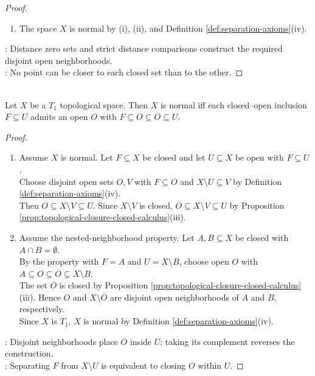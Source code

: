 \begin{proposition}
\begin{proof}
\begin{enumerate}[label=(\roman*)]
\begin{enumerate}[label=(\alph*)]
\item {}: The intersection $O_1\cap O_2$ is empty because $d_1(x)<d_2(x)$ and $d_2(x)<d_1(x)$ cannot both hold.
\end{enumerate}
\item The space $X$ is normal by (i), (ii), and Definition \ref{def:separation-axioms}(iv).
\end{enumerate}
: Distance zero sets and strict distance comparisons construct the required disjoint open neighborhoods.\\
: No point can be closer to each closed set than to the other.
\end{proof}
\end{proposition}

\begin{proposition} \label{prop:normality-nested-neighborhoods} \\
Let $X$ be a $T_1$ topological space. Then $X$ is normal iff each closed--open inclusion $F\subseteq U$ admits an open $O$ with $F\subseteq O\subseteq\overline{O}\subseteq U$.
\begin{proof}
\begin{enumerate}[label=\roman*.]
\setlength{\itemsep}{0pt}
\item[$(\Rightarrow)$] Assume $X$ is normal. Let $F\subseteq X$ be closed and let $U\subseteq X$ be open with $F\subseteq U$.\\
Choose disjoint open sets $O,V$ with $F\subseteq O$ and $X\setminus U\subseteq V$ by Definition \ref{def:separation-axioms}(iv).\\
Then $O\subseteq X\setminus V\subseteq U$. Since $X\setminus V$ is closed, $\overline{O}\subseteq X\setminus V\subseteq U$ by Proposition \ref{prop:topological-closure-closed-calculus}(iii).
\item[$(\Leftarrow)$] Assume the nested-neighborhood property. Let $A,B\subseteq X$ be closed with $A\cap B=\emptyset$.\\
By the property with $F=A$ and $U=X\setminus B$, choose open $O$ with $A\subseteq O\subseteq\overline{O}\subseteq X\setminus B$.\\
The set $\overline{O}$ is closed by Proposition \ref{prop:topological-closure-closed-calculus}(iii). Hence $O$ and $X\setminus\overline{O}$ are disjoint open neighborhoods of $A$ and $B$, respectively.\\
Since $X$ is $T_1$, $X$ is normal by Definition \ref{def:separation-axioms}(iv).
\end{enumerate}
: Disjoint neighborhoods place $\overline{O}$ inside $U$; taking its complement reverses the construction.\\
: Separating $F$ from $X\setminus U$ is equivalent to closing $O$ within $U$.
\end{proof}
\end{proposition}

